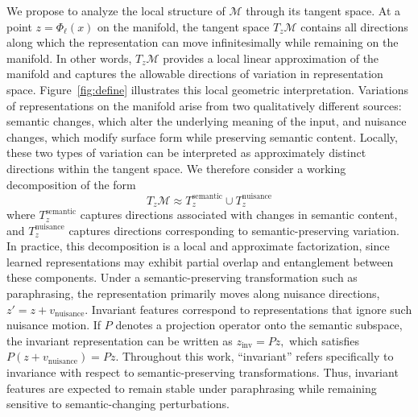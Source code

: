 We propose to analyze the local structure of \(\mathcal{M}\) through its tangent space. At a point \(z=\Phi_\ell(x)\) on the manifold, the tangent space \(T_z\mathcal{M}\) contains all directions along which the representation can move infinitesimally while remaining on the manifold. In other words, \(T_z\mathcal{M}\) provides a local linear approximation of the manifold and captures the allowable directions of variation in representation space. 
Figure~\ref{fig:define} illustrates this local geometric interpretation. Variations of representations on the manifold arise from two qualitatively different sources: semantic changes, which alter the underlying meaning of the input, and nuisance changes, which modify surface form while preserving semantic content. 
Locally, these two types of variation can be interpreted as approximately distinct directions within the tangent space. We therefore consider a working decomposition of the form
\begin{equation}
T_z\mathcal{M} \approx T_z^{\mathrm{semantic}} \cup T_z^{\mathrm{nuisance}}
\label{eq: tan_decompose}
\end{equation}
where $T^{\text{semantic}}_z$ captures directions associated with changes in semantic content, and $T^{\text{nuisance}}_z$ captures directions corresponding to semantic-preserving variation. In practice, this decomposition is a local and approximate factorization, since learned representations may exhibit partial overlap and entanglement between these components. 
Under a semantic-preserving transformation such as paraphrasing, the representation primarily moves along nuisance directions,
\(
z' = z + v_{\text{nuisance}} .
\)
Invariant features correspond to representations that ignore such nuisance motion. If \(P\) denotes a projection operator onto the semantic subspace, the invariant representation can be written as
\(
z_{\text{inv}} = Pz,
\)
which satisfies
\(
P(z + v_{\text{nuisance}}) = Pz.
\)
Throughout this work, ``invariant'' refers specifically to invariance with respect to semantic-preserving transformations. Thus, invariant features are expected to remain stable under paraphrasing while remaining sensitive to semantic-changing perturbations.

